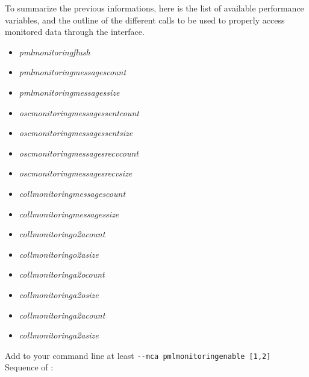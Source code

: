 To summarize the previous informations, here is the list of available
performance variables, and the outline of the different calls to be
used to properly access monitored data through the \mpit{} interface.
\begin{itemize}
\item \textit{pml\brkunds{}monitoring\brkunds{}flush}
\item
  \textit{pml\brkunds{}monitoring\brkunds{}messages\brkunds{}count}
\item \textit{pml\brkunds{}monitoring\brkunds{}messages\brkunds{}size}
\item
  \textit{osc\brkunds{}monitoring\brkunds{}messages\brkunds{}sent\brkunds{}count}
\item
  \textit{osc\brkunds{}monitoring\brkunds{}messages\brkunds{}sent\brkunds{}size}
\item
  \textit{osc\brkunds{}monitoring\brkunds{}messages\brkunds{}recv\brkunds{}count}
\item
  \textit{osc\brkunds{}monitoring\brkunds{}messages\brkunds{}recv\brkunds{}size}
\item
  \textit{coll\brkunds{}monitoring\brkunds{}messages\brkunds{}count}
\item
  \textit{coll\brkunds{}monitoring\brkunds{}messages\brkunds{}size}
\item \textit{coll\brkunds{}monitoring\brkunds{}o2a\brkunds{}count}
\item \textit{coll\brkunds{}monitoring\brkunds{}o2a\brkunds{}size}
\item \textit{coll\brkunds{}monitoring\brkunds{}a2o\brkunds{}count}
\item \textit{coll\brkunds{}monitoring\brkunds{}a2o\brkunds{}size}
\item \textit{coll\brkunds{}monitoring\brkunds{}a2a\brkunds{}count}
\item \textit{coll\brkunds{}monitoring\brkunds{}a2a\brkunds{}size}
\end{itemize}
Add to your command line at least \texttt{-{}-mca
  pml\brkunds{}monitoring\brkunds{}enable [1,2]} \\ Sequence of
\mpit{}:
